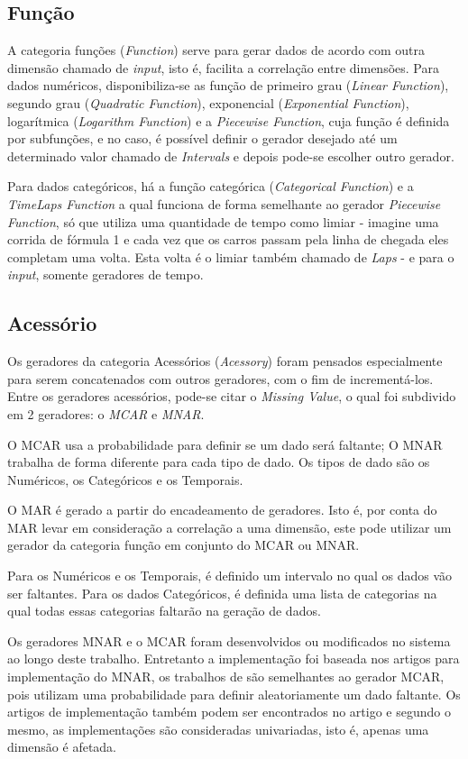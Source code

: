 \documentclass[
	12pt,				%
	openright,			%
	oneside,			%
	a4paper,			%
	english,			%
	brazil				%
	]{abntex2}
\begin{document}
		\subsection{Função}
			A categoria funções (\emph{Function}) serve para gerar dados de acordo com outra dimensão chamado de \emph{input}, isto é, facilita a correlação entre dimensões.
			Para dados numéricos, disponibiliza-se as 
				função de primeiro grau (\emph{Linear Function}), 
				segundo grau (\emph{Quadratic Function}), 
				exponencial (\emph{Exponential Function}), 
				logarítmica (\emph{Logarithm Function}) e
				a \emph{Piecewise Function}, cuja função é definida por subfunções, e no caso, é possível definir o gerador desejado até um determinado valor chamado de \emph{Intervals} e depois pode-se escolher outro gerador.
			\par
			Para dados categóricos, há a função categórica (\emph{Categorical Function}) e 
			a \emph{TimeLaps Function} a qual funciona de forma semelhante ao gerador \emph{Piecewise Function}, só que utiliza uma quantidade de tempo como limiar - imagine uma corrida de fórmula 1 e cada vez que os carros passam pela linha de chegada eles completam uma volta. 
			Esta volta é o limiar também chamado de \emph{Laps} - e para o \emph{input}, somente geradores de tempo.
		\subsection{Acessório}
			Os geradores da categoria Acessórios (\emph{Acessory}) foram pensados especialmente para serem concatenados com outros geradores, com o fim de incrementá-los.
			Entre os geradores acessórios, pode-se citar o \emph{Missing Value}, o qual foi subdivido em 2 geradores: o \emph{MCAR} e \emph{MNAR}.
			\par
			O MCAR usa a probabilidade para definir se um dado será faltante;
			O MNAR trabalha de forma diferente para cada tipo de dado.
			Os tipos de dado são os Numéricos, os Categóricos e os Temporais.
			\par
			O MAR é gerado a partir do encadeamento de geradores.
			Isto é, por conta do MAR levar em consideração a correlação a uma dimensão,
			este pode utilizar um gerador da categoria função em conjunto do MCAR ou MNAR.
			\par
			Para os Numéricos e os Temporais, é definido um intervalo no qual os dados vão ser faltantes.
			Para os dados Categóricos, é definida uma lista de categorias na qual todas essas categorias faltarão na geração de dados.
			\par
			 Os geradores MNAR e o MCAR foram desenvolvidos ou modificados no sistema ao longo deste trabalho.
			 Entretanto a implementação foi baseada nos artigos \cite{twala2009empirical} \cite{xia2017adjusted} para implementação do MNAR,
			 os trabalhos de \cite{rieger2010random} \cite{xia2017adjusted} são semelhantes ao gerador MCAR, pois utilizam uma probabilidade para definir aleatoriamente um dado faltante.
			 Os artigos de implementação também podem ser encontrados no artigo \cite{santos2019generating} e segundo o mesmo, as implementações são consideradas univariadas, isto é, apenas uma dimensão é afetada.
			  
\end{document}
